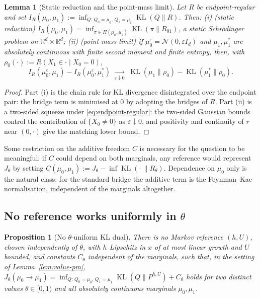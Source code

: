 \documentclass[letterpaper,10pt,conference]{IEEEtran}
\newtheorem{lemma}{Lemma}
\newtheorem{proposition}{Proposition}
\newcommand{\KL}{\operatorname{KL}}
\newcommand{\RR}{\mathbb{R}}
\newcommand{\cN}{\mathcal{N}}
\begin{document}
	\begin{lemma}[Static reduction and the point-mass limit]
		\label{lem:static}
		Let $R$ be endpoint-regular and set
		$I_R(\mu_0,\mu_1):=\inf_{Q:\,Q_0=\mu_0,\,Q_1=\mu_1}\KL(Q\|R)$. Then:
		(i) {(static reduction)}
		$I_R(\mu_0,\mu_1)=\inf_{\pi\in\Pi(\mu_0,\mu_1)}\KL(\pi\|R_{01})$, a static
		Schr\"odinger problem on $\RR^d\times\RR^d$;
		(ii) {(point-mass limit)} if $\mu_0^\varepsilon=\cN(0,\varepsilon I_d)$
		and $\mu_1,\mu_1^*$ are absolutely continuous with finite second moment and
		finite entropy, then, with $\rho_0(\cdot):=R(X_1\in\cdot\mid X_0=0)$,
		\begin{equation}
			\label{eq:pm-limit}
			I_R(\mu_0^\varepsilon,\mu_1)-I_R(\mu_0^\varepsilon,\mu_1^*)
			\;\xrightarrow[\varepsilon\downarrow0]{}\;
			\KL(\mu_1\|\rho_0)-\KL(\mu_1^*\|\rho_0).
		\end{equation}
	\end{lemma}
	
	\begin{proof}
		Part (i) is the chain rule for KL divergence disintegrated over the
		endpoint pair: the bridge term is minimised at $0$ by adopting the bridges
		of $R$. Part (ii) is a two-sided squeeze under
		\eqref{eq:endpoint-regular}: the two-sided Gaussian bounds control the
		contribution of $\{X_0\neq0\}$ as $\varepsilon\downarrow0$, and positivity
		and continuity of $r$ near $(0,\cdot)$ give the matching lower bound.
	\end{proof}
	
	Some restriction on the additive freedom $C$ is necessary for the question
	to be meaningful: if $C$ could depend on both marginals, any reference
	would represent $J_\theta$ by setting
	$C(\mu_0,\mu_1):=J_\theta-\inf\KL(\cdot\,\|R_\theta)$. Dependence on $\mu_0$
	only is the natural class: for the standard bridge the additive term is the
	Feynman--Kac normalisation, independent of the marginals altogether.
	
	\subsection{No reference works uniformly in $\theta$}
	\begin{proposition}[No $\theta$-uniform KL dual]
		\label{prop:no-uniform}
		There is no Markov reference $(h,U)$, chosen independently of $\theta$, with
		$h$ Lipschitz in $x$ of at most linear growth and $U$ bounded, and constants
		$C_\theta$ independent of the marginals, such that, in the setting of
		Lemma~\ref{lem:value-pm},
		$J_\theta(\mu_0\to\mu_1)
		=\inf_{Q:\,Q_0=\mu_0,\,Q_1=\mu_1}\KL(Q\|P^{h,U})+C_\theta$
		holds for two distinct values $\theta\in[0,1)$ and all absolutely continuous
		marginals $\mu_0,\mu_1$.
	\end{proposition}
	
\end{document}
